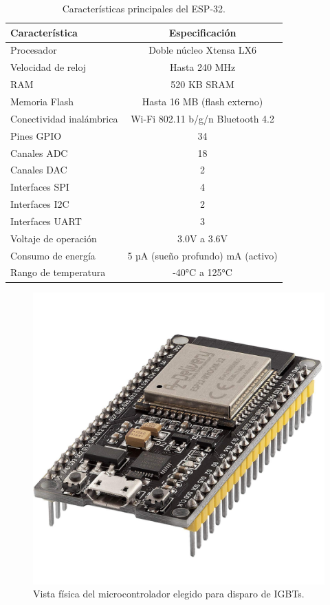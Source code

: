 \begin{table}[h]
	\centering
	\begin{tabular}{|l|c|}
		\hline
		\textbf{Característica} & \textbf{Especificación} \\
		\hline
		Procesador & Doble núcleo Xtensa LX6 \\
		\hline
		Velocidad de reloj & Hasta 240 MHz \\
		\hline
		RAM & 520 KB SRAM \\
		\hline
		Memoria Flash & Hasta 16 MB (flash externo) \\
		\hline
		Conectividad inalámbrica & Wi-Fi 802.11 b/g/n \newline Bluetooth 4.2 \\
		\hline
		Pines GPIO & 34 \\
		\hline
		Canales ADC & 18 \\
		\hline
		Canales DAC & 2 \\
		\hline
		Interfaces SPI & 4 \\
		\hline
		Interfaces I2C & 2 \\
		\hline
		Interfaces UART & 3 \\
		\hline
		Voltaje de operación & 3.0V a 3.6V \\
		\hline
		Consumo de energía & 5 µA (sueño profundo) \newline 180 mA (activo) \\
		\hline
		Rango de temperatura & -40°C a 125°C \\
		\hline
	\end{tabular}
	\caption{Características principales del ESP-32.}
	\label{tab:caracteristicas_esp32}
\end{table}

\begin{figure}
	\centering
	\includegraphics[width=0.4\linewidth]{img/esp32}
	\caption{Vista física del microcontrolador elegido para disparo de IGBTs.}
	\label{fig:esp32}
\end{figure}


